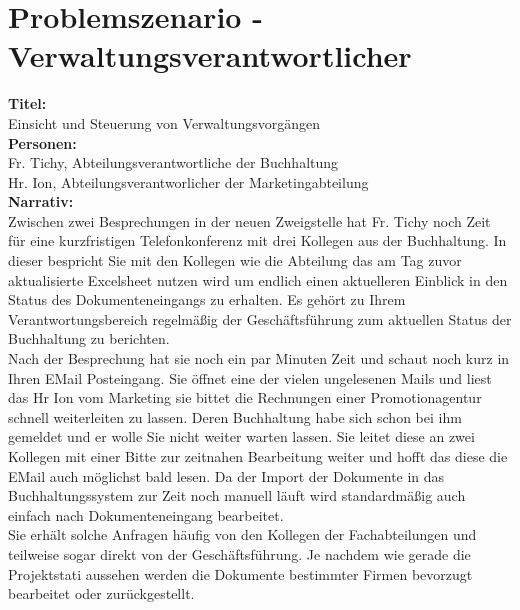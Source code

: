 \documentclass[11pt,oneside,a4paper,notitlepage]{article}
\begin{document}
%
\section{Problemszenario - Verwaltungsverantwortlicher}


\textbf{Titel: }\\
Einsicht und Steuerung von Verwaltungsvorgängen\\
\textbf{Personen: }\\
Fr. Tichy, Abteilungsverantwortliche der Buchhaltung\\
Hr. Ion, Abteilungsverantworlicher der Marketingabteilung\\[1cm]
\noindent
\textbf{Narrativ: }\\
Zwischen zwei Besprechungen in der neuen Zweigstelle hat Fr. Tichy noch Zeit für eine kurzfristigen Telefonkonferenz mit drei Kollegen 
aus der Buchhaltung. In dieser bespricht Sie mit den Kollegen wie die Abteilung das am Tag zuvor aktualisierte Excelsheet nutzen wird  um endlich einen aktuelleren Einblick in den Status des Dokumenteneingangs zu erhalten. Es gehört zu Ihrem Verantwortungsbereich regelmäßig der Geschäftsführung zum aktuellen Status der Buchhaltung zu berichten.\\
Nach der Besprechung hat sie noch ein par Minuten Zeit und schaut noch kurz in Ihren EMail Posteingang. Sie öffnet eine der vielen ungelesenen Mails und liest das Hr Ion vom Marketing sie bittet die Rechnungen einer Promotionagentur schnell weiterleiten zu lassen. Deren Buchhaltung habe sich schon bei ihm gemeldet und er wolle Sie nicht weiter warten lassen. Sie leitet diese an zwei Kollegen 
mit einer Bitte zur zeitnahen Bearbeitung weiter und hofft das diese die EMail auch möglichst bald lesen. 
Da der Import der Dokumente in das Buchhaltungssystem zur Zeit noch manuell läuft wird standardmäßig auch einfach nach Dokumenteneingang bearbeitet.\\
Sie erhält solche Anfragen häufig von den Kollegen der Fachabteilungen und teilweise sogar direkt von der Geschäftsführung. Je nachdem wie gerade die Projektstati aussehen werden die Dokumente bestimmter Firmen bevorzugt bearbeitet oder zurückgestellt.



%
\end{document}
